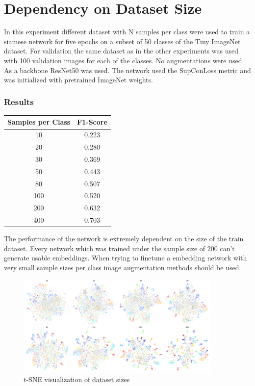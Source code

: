 \documentclass[12pt,a4paper]{report}
\begin{document}
\newpage


\section{Dependency on Dataset Size}

In this experiment different dataset with N samples per class were used to train a siamese network for five epochs on a subset of 50 classes of the Tiny ImageNet dataset.
For validation the same dataset as in the other experiments was used with 100 validation images for each of the classes.
No augmentations were used.
As a backbone ResNet50 was used.
The network used the SupConLoss metric and was initialized with pretrained ImageNet weights.


\subsubsection{Results}
\begin{table}
	\begin{tabular}{ | c | c | }
		\hline
		Samples per Class &  F1-Score \\ 
		\hline
		10 &  0.223 \\ 
		\hline
		20 & 0.280 \\ 
		\hline
		30 & 0.369 \\ 
		\hline
		50 & 0.443 \\ 
		\hline
		80 & 0.507  \\ 
		\hline
		100 & 0.520 \\ 
		\hline
		200 & 0.632 \\ 
		\hline
		400 & 0.703 \\ 
		\hline
	\end{tabular}
\end{table} 

The performance of the network is extremely dependent on the size of the train dataset.
Every network which was trained under the sample size of 200 can't generate usable embeddings.
When trying to finetune a embedding network with very small sample sizes per class image augmentation methods should be used. 

\begin{figure}[hb]
	\centering
	\includegraphics[width=0.9\textwidth]{../plots/dataset_size.png}
	\caption{t-SNE visualization of dataset sizes}
\end{figure}
\end{document}
